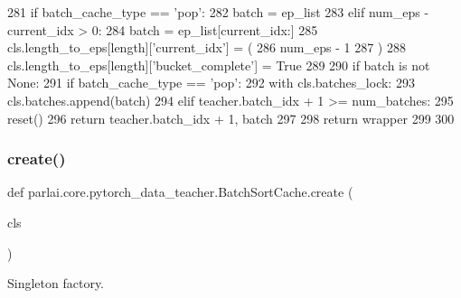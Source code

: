 \begin{DoxyCode}
281                                 \textcolor{keywordflow}{if} batch\_cache\_type == \textcolor{stringliteral}{'pop'}:
282                                     batch = ep\_list
283                                 \textcolor{keywordflow}{elif} num\_eps - current\_idx > 0:
284                                     batch = ep\_list[current\_idx:]
285                                     cls.length\_to\_eps[length][\textcolor{stringliteral}{'current\_idx'}] = (
286                                         num\_eps - 1
287                                     )
288                                 cls.length\_to\_eps[length][\textcolor{stringliteral}{'bucket\_complete'}] = \textcolor{keyword}{True}
289 
290                     \textcolor{keywordflow}{if} batch \textcolor{keywordflow}{is} \textcolor{keywordflow}{not} \textcolor{keywordtype}{None}:
291                         \textcolor{keywordflow}{if} batch\_cache\_type == \textcolor{stringliteral}{'pop'}:
292                             with cls.batches\_lock:
293                                 cls.batches.append(batch)
294                         \textcolor{keywordflow}{elif} teacher.batch\_idx + 1 >= num\_batches:
295                             reset()
296                         \textcolor{keywordflow}{return} teacher.batch\_idx + 1, batch
297 
298         \textcolor{keywordflow}{return} wrapper
299 
300 
\end{DoxyCode}
\mbox{\label{classparlai_1_1core_1_1pytorch__data__teacher_1_1BatchSortCache_a272dbfe6529aa39066b4ad8504f40f5d}} 
\subsubsection{\texorpdfstring{create()}{create()}}
{\footnotesize\ttfamily def parlai.\+core.\+pytorch\+\_\+data\+\_\+teacher.\+Batch\+Sort\+Cache.\+create (\begin{DoxyParamCaption}\item[{}]{cls }\end{DoxyParamCaption})}

\begin{DoxyVerb}Singleton factory.
\end{DoxyVerb}
 

